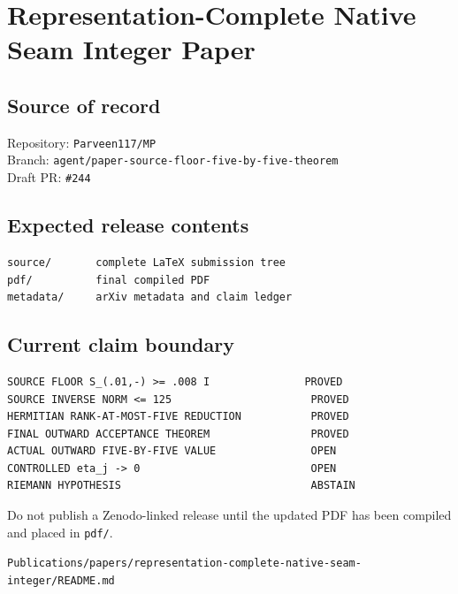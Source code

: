 \hypertarget{representation-complete-native-seam-integer-paper}{%
\chapter{Representation-Complete Native Seam Integer Paper}\label{representation-complete-native-seam-integer-paper}}

\hypertarget{source-of-record}{%
\section{Source of record}\label{source-of-record}}

Repository: \texttt{Parveen117/MP}\\
Branch: \texttt{agent/paper-source-floor-five-by-five-theorem}\\
Draft PR: \texttt{\#244}

\hypertarget{expected-release-contents}{%
\section{Expected release contents}\label{expected-release-contents}}

\begin{verbatim}
source/       complete LaTeX submission tree
pdf/          final compiled PDF
metadata/     arXiv metadata and claim ledger
\end{verbatim}

\hypertarget{current-claim-boundary}{%
\section{Current claim boundary}\label{current-claim-boundary}}

\begin{verbatim}
SOURCE FLOOR S_(.01,-) >= .008 I               PROVED
SOURCE INVERSE NORM <= 125                      PROVED
HERMITIAN RANK-AT-MOST-FIVE REDUCTION           PROVED
FINAL OUTWARD ACCEPTANCE THEOREM                PROVED
ACTUAL OUTWARD FIVE-BY-FIVE VALUE               OPEN
CONTROLLED eta_j -> 0                           OPEN
RIEMANN HYPOTHESIS                              ABSTAIN
\end{verbatim}

Do not publish a Zenodo-linked release until the updated PDF has been compiled and placed in \texttt{pdf/}.

\begin{flushright}\small\texttt{Publications/papers/representation-complete-native-seam-integer/README.md}\end{flushright}
